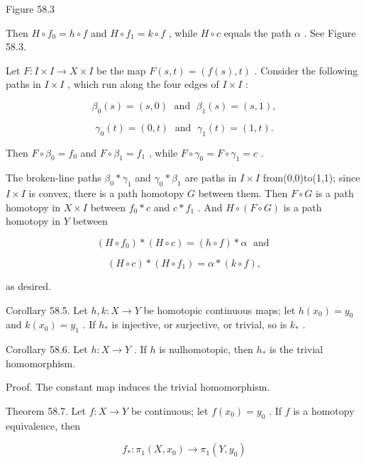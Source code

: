 Figure 58.3

Then \(H \circ  {f}_{0} = h \circ  f\) and \(H \circ  {f}_{1} = k \circ  f\) , while \(H \circ  c\) equals the path \(\alpha\) . See Figure 58.3.

Let \(F : I \times  I \rightarrow  X \times  I\) be the map \(F\left( {s,t}\right)  = \left( {f\left( s\right) ,t}\right)\) . Consider the following paths in \(I \times  I\) , which run along the four edges of \(I \times  I\) :

\[
{\beta }_{0}\left( s\right)  = \left( {s,0}\right) \;\text{ and }\;{\beta }_{1}\left( s\right)  = \left( {s,1}\right) ,
\]

\[
{\gamma }_{0}\left( t\right)  = \left( {0,t}\right) \;\text{ and }\;{\gamma }_{1}\left( t\right)  = \left( {1,t}\right) .
\]

Then \(F \circ  {\beta }_{0} = {f}_{0}\) and \(F \circ  {\beta }_{1} = {f}_{1}\) , while \(F \circ  {\gamma }_{0} = F \circ  {\gamma }_{1} = c\) .

The broken-line paths \({\beta }_{0} * {\gamma }_{1}\) and \({\gamma }_{0} * {\beta }_{1}\) are paths in \(I \times  I\) from(0,0)to(1,1); since \(I \times  I\) is convex, there is a path homotopy \(G\) between them. Then \(F \circ  G\) is a path homotopy in \(X \times  I\) between \({f}_{0} * c\) and \(c * {f}_{1}\) . And \(H \circ  \left( {F \circ  G}\right)\) is a path homotopy in \(Y\) between

\[
\left( {H \circ  {f}_{0}}\right)  * \left( {H \circ  c}\right)  = \left( {h \circ  f}\right)  * \alpha \;\text{ and }
\]

\[
\left( {H \circ  c}\right)  * \left( {H \circ  {f}_{1}}\right)  = \alpha  * \left( {k \circ  f}\right) ,
\]

as desired.

Corollary 58.5. Let \(h,k : X \rightarrow  Y\) be homotopic continuous maps; let \(h\left( {x}_{0}\right)  = {y}_{0}\) and \(k\left( {x}_{0}\right)  = {y}_{1}\) . If \({h}_{ * }\) is injective, or surjective, or trivial, so is \({k}_{ * }\) .

Corollary 58.6. Let \(h : X \rightarrow  Y\) . If \(h\) is nulhomotopic, then \({h}_{ * }\) is the trivial homomorphism.

Proof. The constant map induces the trivial homomorphism.

Theorem 58.7. Let \(f : X \rightarrow  Y\) be continuous; let \(f\left( {x}_{0}\right)  = {y}_{0}\) . If \(f\) is a homotopy equivalence, then

\[
{f}_{ * } : {\pi }_{1}\left( {X,{x}_{0}}\right)  \rightarrow  {\pi }_{1}\left( {Y,{y}_{0}}\right)
\]


